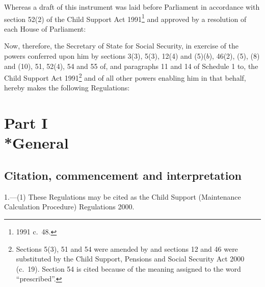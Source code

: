 \documentclass[12pt,a4paper]{article}
\title{\regstitle}
\author{S.I.\ 2001 No.\ 157}
\date{Made
18th January 2001\\
Coming into force
in accordance with regulation 1(5)
}
\begin{document}
\maketitle

\noindent
Whereas a draft of this instrument was laid before Parliament in accordance with section 52(2) of the Child Support Act 1991\footnote{1991 c.\ 48.} and approved by a resolution of each House of Parliament:

Now, therefore, the Secretary of State for Social Security, in exercise of the powers conferred upon him by sections 3(3), 5(3), 12(4) and (5)($b$), 46(2), (5), (8) and (10), 51, 52(4), 54 and 55 of, and paragraphs 11 and 14 of Schedule 1 to, the Child Support Act 1991\footnote{Sections 5(3), 51 and 54 were amended by and sections 12 and 46 were substituted by the Child Support, Pensions and Social Security Act 2000 (c.\ 19). Section 54 is cited because of the meaning assigned to the word “prescribed”.} and of all other powers enabling him in that behalf, hereby makes the following Regulations: 

{\sloppy

\tableofcontents

}

\bigskip

\setcounter{secnumdepth}{-2}

\section[Part I --- General]{Part I\\*General}

\renewcommand\parthead{--- Part I}

\subsection[1. Citation, commencement and interpretation]{Citation, commencement and interpretation}

1.---(1)  These Regulations may be cited as the Child Support (Maintenance Calculation Procedure) Regulations 2000.
\end{document}
